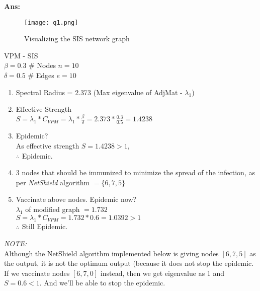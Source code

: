 \documentclass{article}%
\begin{document}
\begin{enumerate}
\textbf{Ans:} \\
\begin{figure}[h]
\centering
\texttt{[image: q1.png]}
\caption{Visualizing the SIS network graph}
\end{figure}
VPM - SIS \\
$ \beta = 0.3 $ \hspace{1cm} \# Nodes $ n = 10 $ \\
$ \delta = 0.5 $ \hspace{1cm} \# Edges $ e = 10 $
\begin{enumerate}
\item Spectral Radius = 2.373 \hspace{1cm} (Max eigenvalue of AdjMat - $\lambda_1$)
\item Effective Strength \\ $ S = \lambda_1 * C_{VPM} = \lambda_1 * \frac{\beta}{\delta} = 2.373 * \frac{0.3}{0.5} = 1.4238 $
\item 	Epidemic? \\
		As effective strength $ S = 1.4238 > 1 $, \\ $ \therefore $ Epidemic.
\item 3 nodes that should be immunized to minimize the spread of the infection, as per \textit{NetShield} algorithm $ = \{6, 7, 5\} $
\item 	Vaccinate above nodes. Epidemic now? \\
		$\lambda_1 $ of modified graph $ = 1.732 $ \\
		$ S = \lambda_1 * C_{VPM} = 1.732 * 0.6 = 1.0392 > 1 $ \\
		$ \therefore $ Still Epidemic.
\end{enumerate}

\textit{NOTE:} \\
Although the NetShield algorithm implemented below is giving nodes $[6,7,5]$ as the output, it is not the optimum output (because it does not stop the epidemic. \\
If we vaccinate nodes $[6,7,0]$ instead, then we get eigenvalue as $1$ and $S = 0.6 < 1$. And we'll be able to stop the epidemic. \\
\hspace{1cm} \\



\newpage


\end{enumerate}
\end{document}
